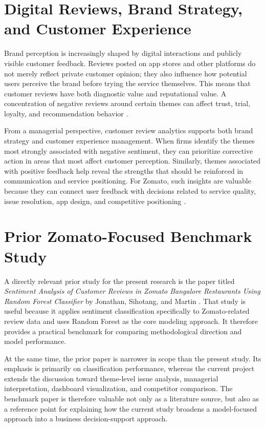 \section{Digital Reviews, Brand Strategy, and Customer Experience}

Brand perception is increasingly shaped by digital interactions and publicly visible customer feedback. Reviews posted on app stores and other platforms do not merely reflect private customer opinion; they also influence how potential users perceive the brand before trying the service themselves. This means that customer reviews have both diagnostic value and reputational value. A concentration of negative reviews around certain themes can affect trust, trial, loyalty, and recommendation behavior \cite{chevalier2006,keller2013}.

From a managerial perspective, customer review analytics supports both brand strategy and customer experience management. When firms identify the themes most strongly associated with negative sentiment, they can prioritize corrective action in areas that most affect customer perception. Similarly, themes associated with positive feedback help reveal the strengths that should be reinforced in communication and service positioning. For Zomato, such insights are valuable because they can connect user feedback with decisions related to service quality, issue resolution, app design, and competitive positioning \cite{lemon2016,verhoef2010,keller2013}.

\section{Prior Zomato-Focused Benchmark Study}

A directly relevant prior study for the present research is the paper titled \textit{Sentiment Analysis of Customer Reviews in Zomato Bangalore Restaurants Using Random Forest Classifier} by Jonathan, Sihotang, and Martin \cite{jonathan2019}. That study is useful because it applies sentiment classification specifically to Zomato-related review data and uses Random Forest as the core modeling approach. It therefore provides a practical benchmark for comparing methodological direction and model performance.

At the same time, the prior paper is narrower in scope than the present study. Its emphasis is primarily on classification performance, whereas the current project extends the discussion toward theme-level issue analysis, managerial interpretation, dashboard visualization, and competitor comparison. The benchmark paper is therefore valuable not only as a literature source, but also as a reference point for explaining how the current study broadens a model-focused approach into a business decision-support approach.

